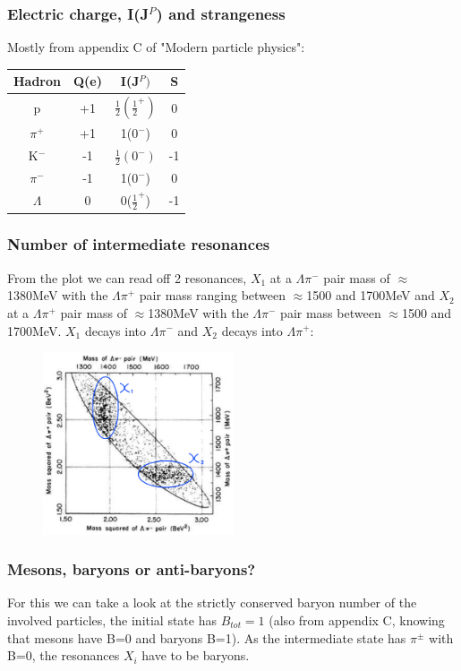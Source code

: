 \documentclass[10pt,a4paper,twoside]{article}
\begin{document}
\subsubsection*{Electric charge, I(J$^P$) and strangeness}
Mostly from appendix C of "Modern particle physics"\cite{Thomson}:
\begin{center}
	\begin{tabular}{c|c|c|c}
		Hadron & Q(e) & I(J$^P)$ & S\\
		\hline
		p & +1 & $\frac{1}{2}(\frac{1}{2}^+)$ & 0\\
		$\pi^+$ & +1 & 1($0^-$)& 0\\
		K$^-$ & -1 & $\frac{1}{2}(0^-)$ & -1\\
		$\pi^-$ & -1 & 1($0^-$) & 0\\
		$\Lambda$ & 0 & 0($\frac{1}{2}^+$) & -1\\
	\end{tabular} 
\end{center}
\subsubsection*{Number of intermediate resonances}
From the plot we can read off 2 resonances, $X_1$ at a $\Lambda\pi^-$ pair mass of $\approx$1380MeV with the $\Lambda\pi^+$ pair mass ranging between $\approx$1500 and 1700MeV and $X_2$ at a $\Lambda\pi^+$ pair mass of $\approx$1380MeV with the $\Lambda\pi^-$ pair mass between $\approx$1500 and 1700MeV. $X_1$ decays into $\Lambda\pi^-$ and $X_2$ decays into $\Lambda\pi^+$:
\begin{figure}[H]
	\centering
	\includegraphics[width=0.5\textwidth]{resonanties.png}
\end{figure}
\subsubsection*{Mesons, baryons or anti-baryons?}
For this we can take a look at the strictly conserved baryon number of the involved particles, the initial state has $B_{tot} = 1$ (also from appendix C, knowing that mesons have B=0 and baryons B=1). As the intermediate state has $\pi^{\pm}$ with B=0, the resonances $X_i$ have to be baryons. 
\end{document}
